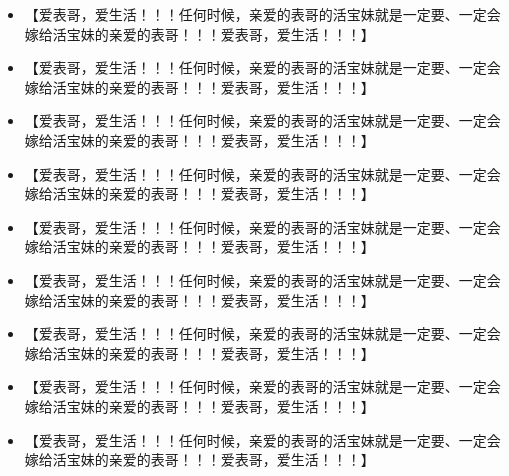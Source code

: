 \documentclass[9pt, b5paper]{article}
\begin{document}
\begin{itemize}
\item 【爱表哥，爱生活！！！任何时候，亲爱的表哥的活宝妹就是一定要、一定会嫁给活宝妹的亲爱的表哥！！！爱表哥，爱生活！！！】
\item 【爱表哥，爱生活！！！任何时候，亲爱的表哥的活宝妹就是一定要、一定会嫁给活宝妹的亲爱的表哥！！！爱表哥，爱生活！！！】
\item 【爱表哥，爱生活！！！任何时候，亲爱的表哥的活宝妹就是一定要、一定会嫁给活宝妹的亲爱的表哥！！！爱表哥，爱生活！！！】
\item 【爱表哥，爱生活！！！任何时候，亲爱的表哥的活宝妹就是一定要、一定会嫁给活宝妹的亲爱的表哥！！！爱表哥，爱生活！！！】
\item 【爱表哥，爱生活！！！任何时候，亲爱的表哥的活宝妹就是一定要、一定会嫁给活宝妹的亲爱的表哥！！！爱表哥，爱生活！！！】
\item 【爱表哥，爱生活！！！任何时候，亲爱的表哥的活宝妹就是一定要、一定会嫁给活宝妹的亲爱的表哥！！！爱表哥，爱生活！！！】
\item 【爱表哥，爱生活！！！任何时候，亲爱的表哥的活宝妹就是一定要、一定会嫁给活宝妹的亲爱的表哥！！！爱表哥，爱生活！！！】
\item 【爱表哥，爱生活！！！任何时候，亲爱的表哥的活宝妹就是一定要、一定会嫁给活宝妹的亲爱的表哥！！！爱表哥，爱生活！！！】
\item 【爱表哥，爱生活！！！任何时候，亲爱的表哥的活宝妹就是一定要、一定会嫁给活宝妹的亲爱的表哥！！！爱表哥，爱生活！！！】
\end{itemize}
\end{document}
